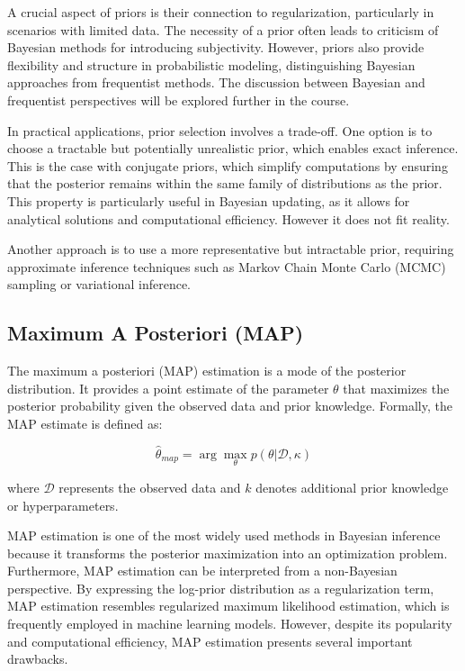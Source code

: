 \documentclass[12pt, a4paper]{article}
\theoremstyle{definition}
\numberwithin{figure}{section}
\numberwithin{equation}{section}
\numberwithin{table}{section}
\begin{document}
A crucial aspect of priors is their connection to regularization, particularly in scenarios with limited data. The necessity of a prior often leads to criticism of Bayesian methods for introducing subjectivity. However, priors also provide flexibility and structure in probabilistic modeling, distinguishing Bayesian approaches from frequentist methods. The discussion between Bayesian and frequentist perspectives will be explored further in the course.

In practical applications, prior selection involves a trade-off. One option is to choose a tractable but potentially unrealistic prior, which enables exact inference. This is the case with conjugate priors, which simplify computations by ensuring that the posterior remains within the same family of distributions as the prior. This property is particularly useful in Bayesian updating, as it allows for analytical solutions and computational efficiency. However it does not fit reality.

Another approach is to use a more representative but intractable prior, requiring approximate inference techniques such as Markov Chain Monte Carlo (MCMC) sampling or variational inference.


\subsection{Maximum A Posteriori (MAP)}
The maximum a posteriori (MAP) estimation is a mode of the posterior distribution. It provides a point estimate of the parameter $\theta$ that maximizes the posterior probability given the observed data and prior knowledge. Formally, the MAP estimate is defined as:

\begin{equation}
\hat{\theta}_{map} = \arg\max\limits_{\theta} p(\theta|\mathcal{D},\kappa)
\end{equation}

where $\mathcal{D}$ represents the observed data and $k$ denotes additional prior knowledge or hyperparameters.

MAP estimation is one of the most widely used methods in Bayesian inference because it transforms the posterior maximization into an optimization problem. Furthermore, MAP estimation can be interpreted from a non-Bayesian perspective. By expressing the log-prior distribution as a regularization term, MAP estimation resembles regularized maximum likelihood estimation, which is frequently employed in machine learning models. However, despite its popularity and computational efficiency, MAP estimation presents several important drawbacks.
\end{document}
